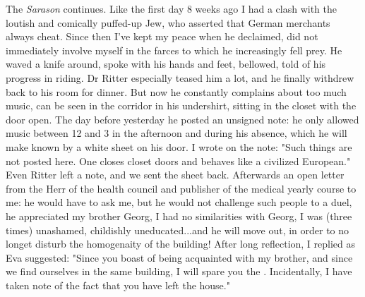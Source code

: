 The \textit{Sarason} continues. Like the first day 8 weeks ago I had a clash with the loutish and comically puffed-up Jew, who asserted that German merchants always cheat. Since then I've kept my peace when he declaimed, did not immediately involve myself in the farces to which he increasingly fell prey. He waved a knife around, spoke with his hands and feet, bellowed, told of his progress in riding. Dr Ritter especially teased him a lot, and he finally withdrew back to his room for dinner. But now he constantly complains about too much music, can be seen in the corridor in his undershirt, sitting in the closet with the door open. The day before yesterday he posted an unsigned note: he only allowed music between 12 and 3 in the afternoon and during his absence, which he will make known by a white sheet on his door. I wrote on the note: "Such things are not posted here. One closes closet doors and behaves like a civilized European." Even Ritter left a note, and we sent the sheet back. Afterwards an open letter from the Herr of the health council and publisher of the medical yearly course to me: he would have to ask me, but he would not challenge such people to a duel, he appreciated my brother Georg, I had no similarities with Georg, I was (three times) unashamed, childishly uneducated...and he will move out, in order to no longet disturb the homogenaity of the building! After long reflection, I replied as Eva suggested: "Since you boast of being acquainted with my brother, and since we find ourselves in the same building, I will spare you the . Incidentally, I have taken note of the fact that you have left the house."

% 